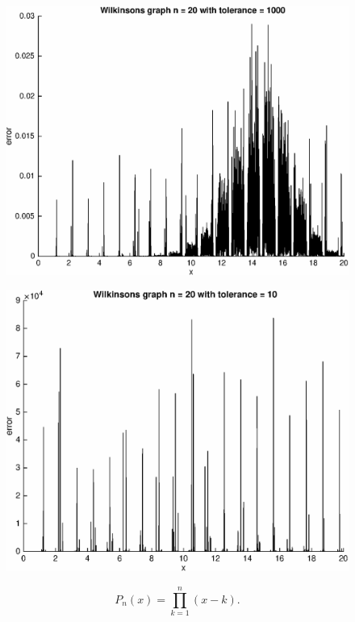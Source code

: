\documentclass[a4paper,12pt]{article}
\begin{document}
\begin{figure}
    \centering
    \includegraphics{test-wilkinsons-tol10-max1000.eps}
\end{figure} 	

\begin{figure}
    \centering
    \includegraphics{test-wilkinsons-tol10-max100.eps}
\end{figure}

\[
P_{n}(x) = \prod_{k=1}^{n}(x-k).
\]
\end{document}
